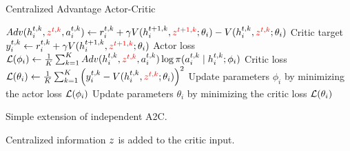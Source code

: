 \begin{frame}[t]{Centralized Advantage Actor-Critic}
{\begin{minipage}{0.95\linewidth}
                            \State $Adv(h^{t,k}_i, {\color{red} z^{t,k}}, a^{t,k}_i) \gets r^{t,k}_i + \gamma V(h^{t+1,k}_i, {\color{red} z^{t+1,k}}; \theta_i) - V(h^{t,k}_i, {\color{red} z^{t,k}}; \theta_i)$
                            \State Critic target $y^{t,k}_i \gets r^{t,k}_i + \gamma V(h^{t+1,k}_i, {\color{red} z^{t+1,k}}; \theta_i)$
                        \EndIf
                        \State Actor loss $\mathcal{L}(\phi_i) \gets \frac{1}{K} \sum_{k=1}^K Adv(h^{t,k}_i, {\color{red} z^{t,k}}, a^{t,k}_i) \log \pi(a^{t,k}_i \mid h^{t,k}_i; \phi_i)$
                        \State Critic loss $\mathcal{L}(\theta_i) \gets \frac{1}{K} \sum_{k=1}^K \left(y^{t,k}_i - V(h^{t,k}_i, {\color{red} z^{t,k}}; \theta_i)\right)^2$
                        \State Update parameters $\phi_i$ by minimizing the actor loss $\mathcal{L}(\phi_i)$
                        \State Update parameters $\theta_i$ by minimizing the critic loss $\mathcal{L}(\theta_i)$
                    \EndFor
                \EndFor
            \ealg
        \end{minipage}
    }
    \hfill
    \begin{minipage}{0.38\textwidth}
        \blist
            \item Simple extension of independent A2C.
            \item Centralized information $z$ is added to the critic input.
        \elist
    \end{minipage}
\end{frame}

